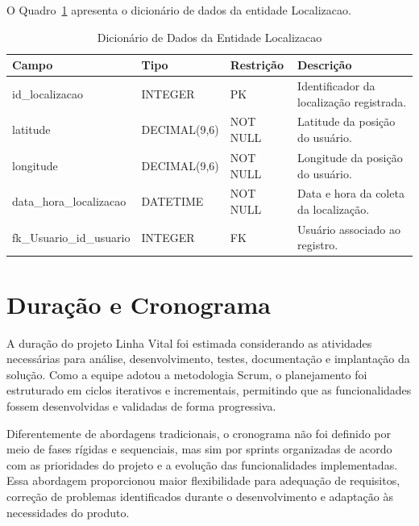 O Quadro~\ref{quad_localizacao} apresenta o dicionário de dados da entidade Localizacao.

\begin{table}[H]
\caption{Dicionário de Dados da Entidade Localizacao}
\label{quad_localizacao}
\centering
\footnotesize

\begin{tabular}{|p{4.0cm}|p{2.5cm}|p{2.5cm}|p{5.5cm}|}
\hline
\textbf{Campo} & \textbf{Tipo} & \textbf{Restrição} & \textbf{Descrição} \\
\hline

id\_localizacao & INTEGER & PK & Identificador da localização registrada. \\
\hline

latitude & DECIMAL(9,6) & NOT NULL & Latitude da posição do usuário. \\
\hline

longitude & DECIMAL(9,6) & NOT NULL & Longitude da posição do usuário. \\
\hline

data\_hora\_localizacao & DATETIME & NOT NULL & Data e hora da coleta da localização. \\
\hline

fk\_Usuario\_id\_usuario & INTEGER & FK & Usuário associado ao registro. \\
\hline

\end{tabular}

\normalsize

\end{table}

\section{Duração e Cronograma}

A duração do projeto Linha Vital foi estimada considerando as atividades necessárias para análise, desenvolvimento, testes, documentação e implantação da solução. Como a equipe adotou a metodologia Scrum, o planejamento foi estruturado em ciclos iterativos e incrementais, permitindo que as funcionalidades fossem desenvolvidas e validadas de forma progressiva.

Diferentemente de abordagens tradicionais, o cronograma não foi definido por meio de fases rígidas e sequenciais, mas sim por sprints organizadas de acordo com as prioridades do projeto e a evolução das funcionalidades implementadas. Essa abordagem proporcionou maior flexibilidade para adequação de requisitos, correção de problemas identificados durante o desenvolvimento e adaptação às necessidades do produto.

